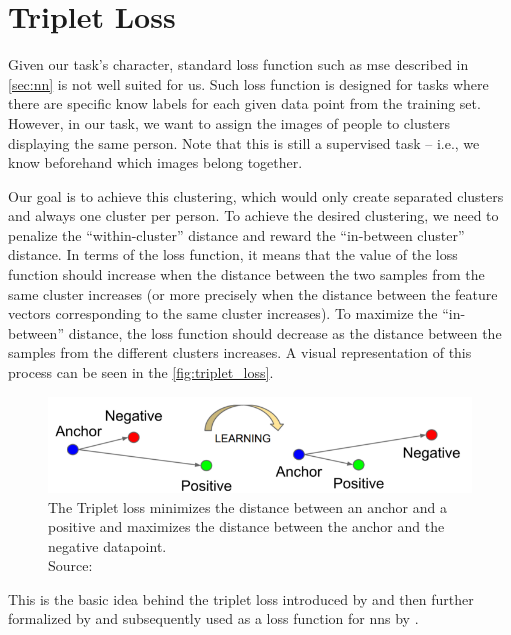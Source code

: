 \section{Triplet Loss}

\label{sec:triplet_loss}

Given our task's character, standard loss function such as \gls{mse} described in \autoref{sec:nn} is not well suited for us. Such loss function is designed for tasks where there are specific know labels for each given data point from the training set. However, in our task, we want to assign the images of people to clusters displaying the same person. Note that this is still a supervised task -- i.e., we know beforehand which images belong together.

Our goal is to achieve this clustering, which would only create separated clusters and always one cluster per person. To achieve the desired clustering, we need to penalize the ``within-cluster'' distance and reward the ``in-between cluster'' distance. In terms of the loss function, it means that the value of the loss function should increase when the distance between the two samples from the same cluster increases (or more precisely when the distance between the feature vectors corresponding to the same cluster increases). To maximize the ``in-between'' distance, the loss function should decrease as the distance between the samples from the different clusters increases. A visual representation of this process can be seen in the \autoref{fig:triplet_loss}.

\begin{figure}
    \centering
    \includegraphics[width=\textwidth]{img/triplet_loss.png}
    \caption[Triplet loss]{The Triplet loss minimizes the distance between an anchor and a positive and maximizes the distance between the anchor and the negative datapoint.\\
    Source: \cite{tripletlossnn}}
    \label{fig:triplet_loss}
\end{figure}

This is the basic idea behind the triplet loss introduced by \cite{tripletlossfirst} and then further formalized by \cite{tripletlosssecond} and subsequently used as a loss function for \glspl{nn} by \cite{tripletlossnn}.

